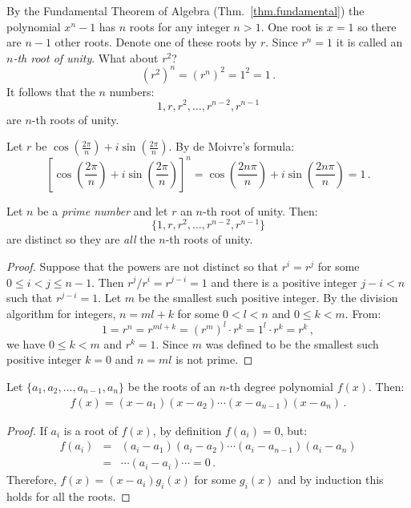 By the Fundamental Theorem of Algebra (Thm.~\ref{thm.fundamental}) the polynomial $x^{n}-1$ has $n$ roots for any integer $n> 1$. One root is $x=1$ so there are $n-1$ other roots. Denote one of these roots by $r$. Since $r^{n}=1$ it is called an \emph{$n$-th root of unity}. What about $r^2$?
\[
(r^{2})^n=(r^{n})^2=1^2=1\,.
\]
It follows that the $n$ numbers:
\[
1, r, r^2, \ldots, r^{n-2}, r^{n-1}
\]
are $n$-th roots of unity.

\begin{advanced}
Let $r$ be $\cos \left(\frac{2\pi}{n}\right) + i\sin  \left(\frac{2\pi}{n}\right)$.
By 	de Moivre's formula:
\[
\left[\cos \left(\frac{2\pi}{n}\right) + i\sin  \left(\frac{2\pi}{n}\right)\right]^{n}=
\cos \left(\frac{2 n\pi}{n}\right) + i\sin  \left(\frac{2 n\pi}{n}\right)= 1\,.
\]
\vspace{-2ex}
\end{advanced}

\begin{theorem}
Let $n$ be a \emph{prime number} and let $r$ an $n$-th root of unity. Then:
\[
\{1,r,r^2,\ldots,r^{n-2},r^{n-1}\}
\]
are distinct so they are \emph{all} the $n$-th roots of unity.
\end{theorem}

\begin{proof}
Suppose that the powers are not distinct so that  $r^i=r^j$ for some $0\leq i<j\leq n-1$. Then $r^j/r^i=r^{j-i}=1$ and there is a positive integer $j\!-\!i<n$ such that $r^{j-i}=1$. Let $m$ be the smallest such positive integer. By the division algorithm for integers, $n=ml+k$ for some $0<l<n$ and $0\leq k<m$. From:
\[
1=r^n=r^{ml+k}=(r^m)^l\cdot r^k=1^l\cdot r^k=r^k\,,
\]
we have $0\leq k<m$ and $r^k=1$. Since $m$  was defined to be the smallest such positive integer $k=0$ and $n=ml$ is not prime.
\end{proof}

\begin{theorem} Let $\{a_1,a_2,\ldots,a_{n-1},a_n\}$ be the roots of an $n$-th degree polynomial $f(x)$. Then:
\begin{align}\label{eq.viete}
f(x) =(x-a_1) (x-a_2)\cdots (x-a_{n-1})(x-a_n)\,.
\end{align}
\end{theorem}

\newpage

\begin{proof}
If $a_i$ is a root of $f(x)$, by definition $f(a_i)=0$, but:
\begin{eqnarray*}
f(a_i)&=&(a_i-a_1) (a_i-a_2)\cdots (a_i-a_{n-1})(a_i-a_n)\\
&=&\cdots (a_i-a_i) \cdots =0\,.
\end{eqnarray*}
Therefore, $f(x)=(x-a_i)g_i(x)$ for some $g_i(x)$ and by induction this holds for all the roots.
\end{proof}

